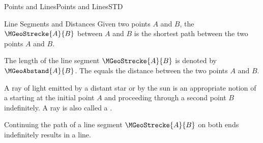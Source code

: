 \begin{MXContent}{Points and Lines}{Points and Lines}{STD}
\begin{MXInfo}{Line Segments and Distances}
Given two points $A$ and $B$, the  $\MGeoStrecke{A}{B}$
between $A$ and $B$ is the shortest path between the two points $A$ and $B$.

\begin{center}
\end{center}

The length of the line segment $\MGeoStrecke{A}{B}$ is denoted by $\MGeoAbstand{A}{B}$. 
The  equals the distance between the two points $A$ and $B$.
\end{MXInfo}

A ray of light emitted by a distant star or by the sun is an appropriate notion of a 
 starting at the initial point $A$ and proceeding through a second point $B$ indefinitely. A
ray is also called a .

\begin{center}
\end{center}

Continuing the path of a line segment $\MGeoStrecke{A}{B}$ on both ends indefinitely results in 
a line.


\end{MXContent}
